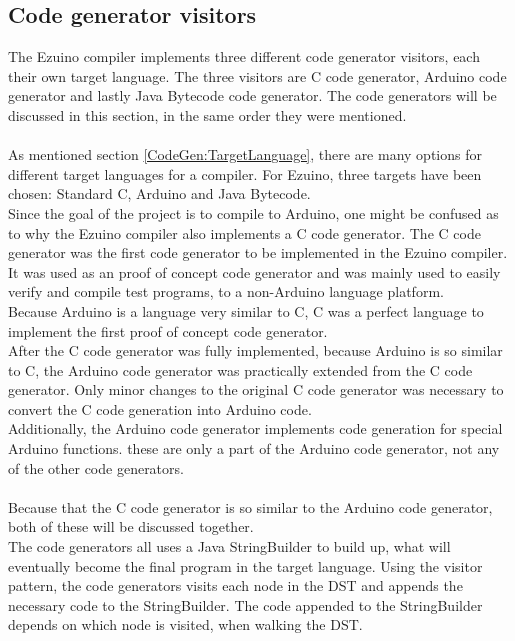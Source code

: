 \subsection{Code generator visitors}
The Ezuino compiler implements three different code generator visitors, each their own target language. The three visitors are C code generator, Arduino code generator and lastly Java Bytecode code generator. The code generators will be discussed in this section, in the same order they were mentioned.
\\\\
As mentioned section \ref{CodeGen:TargetLanguage}, there are many options for different target languages for a compiler. For Ezuino, three targets have been chosen: Standard C, Arduino and Java Bytecode.\\
Since the goal of the project is to compile to Arduino, one might be confused as to why the Ezuino compiler also implements a C code generator. The C code generator was the first code generator to be implemented in the Ezuino compiler. It was used as an proof of concept code generator and was mainly used to easily verify and compile test programs, to a non-Arduino language platform.\\
Because Arduino is a language very similar to C, C was a perfect language to implement the first proof of concept code generator.\\
After the C code generator was fully implemented, because Arduino is so similar to C, the Arduino code generator was practically extended from the C code generator. Only minor changes to the original C code generator was necessary to convert the C code generation into Arduino code.\\
Additionally, the Arduino code generator implements code generation for special Arduino functions. these are only a part of the Arduino code generator, not any of the other code generators.
\\\\
Because that the C code generator is so similar to the Arduino code generator, both of these will be discussed together.\\
The code generators all uses a Java StringBuilder to build up, what will eventually become the final program in the target language. Using the visitor pattern, the code generators visits each node in the DST and appends the necessary code to the StringBuilder. The code appended to the StringBuilder depends on which node is visited, when walking the DST.\\
